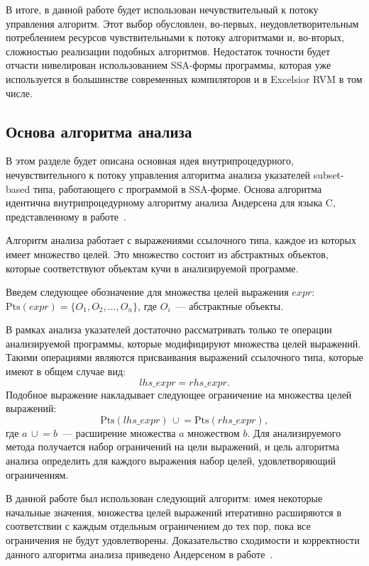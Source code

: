 \documentclass[14pt,titlepage]{extarticle}
\newcommand{\Pts}[1]{\textrm{Pts}(#1)}
\newcommand{\cupe}{\,\cup\!\!=}
\newcommand{\eng}[1]{{\English#1}}
\begin{document}
        В итоге, в данной работе будет использован нечувствительный к потоку
        управления алгоритм. Этот выбор обусловлен, во-первых,
        неудовлетворительным потреблением ресурсов чувствительными к потоку
        алгоритмами и, во-вторых, сложностью реализации подобных алгоритмов.
        Недостаток точности будет отчасти нивелирован использованием SSA-формы
        программы, которая уже используется в большинстве современных
        компиляторов и в \eng{Excelsior RVM} в том числе.

    \subsection{Основа алгоритма анализа}
      \label{section:algorithm_basis}

      В этом разделе будет описана основная идея внутрипроцедурного,
      нечувствительного к потоку управления алгоритма анализа указателей
      \eng{subset-based} типа, работающего с программой в SSA-форме. Основа
      алгоритма идентична внутрипроцедурному алгоритму анализа Андерсена для
      языка C, представленному в работе~\cite{andersen}.

      Алгоритм анализа работает с выражениями ссылочного типа, каждое из
      которых имеет множество целей. Это множество состоит из абстрактных
      объектов, которые соответствуют объектам кучи в анализируемой программе.

      Введем следующее обозначение для множества целей выражения $expr$:
      $\Pts{expr} = \{O_1, O_2, \ldots, O_n\}$, где $O_i$~--- абстрактные объекты.

      В рамках анализа указателей достаточно рассматривать только те операции
      анализируемой программы, которые модифицируют множества целей выражений.
      Такими операциями являются присваивания выражений ссылочного типа,
      которые имеют в общем случае вид:
      \[lhs\_expr = rhs\_expr.\]
      Подобное выражение накладывает следующее ограничение на множества целей
      выражений:
      \[\Pts{lhs\_expr} \cupe \Pts{rhs\_expr},\]
      где $a \cupe b$~--- расширение множества $a$ множеством $b$.
      Для анализируемого метода получается набор ограничений на цели выражений,
      и цель алгоритма анализа определить для каждого выражения набор целей,
      удовлетворяющий ограничениям.

      В данной работе был использован следующий алгоритм: имея некоторые
      начальные значения, множества целей выражений итеративно расширяются в
      соответствии с каждым отдельным ограничением до тех пор, пока все
      ограничения не будут удовлетворены. Доказательство сходимости и
      корректности данного алгоритма анализа приведено Андерсеном в
      работе~\cite{andersen}.
\end{document}
